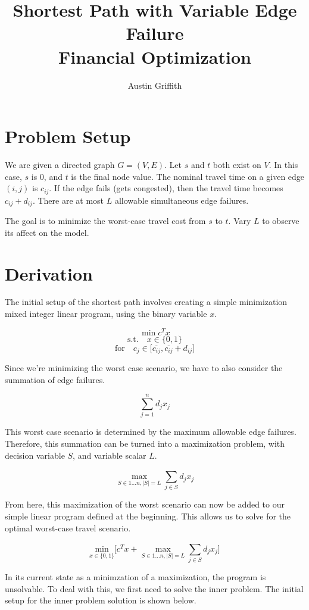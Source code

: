 \documentclass{article}
\title{Shortest Path with Variable Edge Failure \\ Financial Optimization}
\author{Austin Griffith}
\affil{Georgia Institute of Technology, Quantitative Finance}
\date{}
\begin{document}
	\maketitle

\section{Problem Setup}
We are given a directed graph $G = (V,E)$. Let $s$ and $t$ both exist on $V$. In this case, $s$ is $0$, and $t$ is the final node value. The nominal travel time on a given edge $(i,j)$ is $c_{ij}$. If the edge fails (gets congested), then the travel time becomes $c_{ij} + d_{ij}$. There are at most $L$ allowable simultaneous edge failures.

The goal is to minimize the worst-case travel cost from $s$ to $t$. Vary $L$ to observe its affect on the model.

\section{Derivation}
The initial setup of the shortest path involves creating a simple minimization mixed integer linear program, using the binary variable $x$.

$$\min c^T x$$
$$
\textrm{s.t.} \quad x \in \{0,1\}
$$
$$
\textrm{for} \quad c_j \in \lbrack\overline{c_{ij}},\overline{c_{ij}} + d_{ij}\rbrack
$$

Since we're minimizing the worst case scenario, we have to also consider the summation of edge failures.

$$
\sum_{j=1}^{n}d_{j}x_{j}
$$

This worst case scenario is determined by the maximum allowable edge failures. Therefore, this summation can be turned into a maximization problem, with decision variable $S$, and variable scalar $L$.

$$
\max_{S \in 1 ... n, |S| = L} \sum_{j \in S}^{}d_{j}x_{j}
$$

From here, this maximization of the worst scenario can now be added to our simple linear program defined at the beginning. This allows us to solve for the optimal worst-case travel scenario.

$$
\underset{x \in \{0,1\}}{\textrm{min}} \lbrack c^T x + \max_{S \in 1 ... n, |S| = L} \sum_{j \in S}^{}d_{j}x_{j} \rbrack
$$

In its current state as a minimzation of a maximization, the program is unsolvable. To deal with this, we first need to solve the inner problem. The initial setup for the inner problem solution is shown below.
\end{document}
